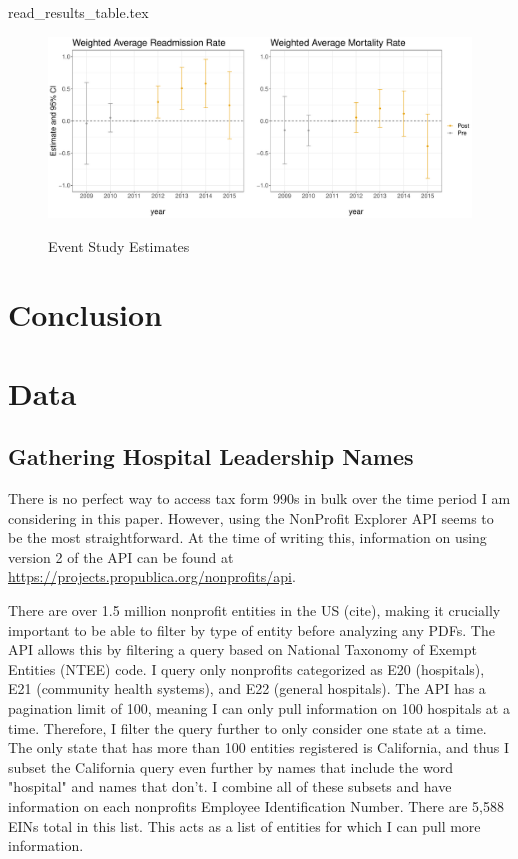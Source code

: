 \documentclass[12pt]{article}
\begin{document}
    {read_results_table.tex}


    \begin{figure}
        \centering
        \caption{Event Study Estimates}
        \includegraphics[scale=.5]{Objects/wa_eventstudy.pdf}
        \label{fig:wa_eventstudy}
    \end{figure}

    \section{Conclusion}

	
	\newpage
	\appendix

    \section{Data}\label{appendixdata}

    \subsection{Gathering Hospital Leadership Names}

    There is no perfect way to access tax form 990s in bulk over the time period I am considering in this paper. However, using the NonProfit Explorer API seems to be the most straightforward. At the time of writing this, information on using version 2 of the API can be found at \hyperlink{https://projects.propublica.org/nonprofits/api}{https://projects.propublica.org/nonprofits/api}. 
    
    There are over 1.5 million nonprofit entities in the US (cite), making it crucially important to be able to filter by type of entity before analyzing any PDFs. The API allows this by filtering a query based on National Taxonomy of Exempt Entities (NTEE) code. I query only nonprofits categorized as E20 (hospitals), E21 (community health systems), and E22 (general hospitals). The API has a pagination limit of 100, meaning I can only pull information on 100 hospitals at a time. Therefore, I filter the query further to only consider one state at a time. The only state that has more than 100 entities registered is California, and thus I subset the California query even further by names that include the word "hospital" and names that don't. I combine all of these subsets and have information on each nonprofits Employee Identification Number. There are 5,588 EINs total in this list. This acts as a list of entities for which I can pull more information. 
\end{document}
